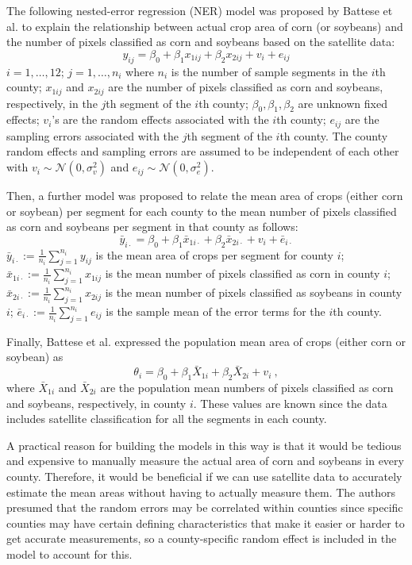 \documentclass{article}
\begin{document}
The following nested-error regression (NER) model was proposed by Battese et al. to explain the relationship between actual crop area of corn (or soybeans) and the number of pixels classified as corn and soybeans based on the satellite data:
\begin{equation}
y_{ij}=\beta_0+\beta_1x_{1ij}+\beta_2x_{2ij}+v_i+e_{ij}
\end{equation}
$i=1,\dots,12$; $j=1,\dots,n_i$ where $n_i$ is the number of sample segments in the $i$th county; $x_{1ij}$ and $x_{2ij}$ are the number of pixels classified as corn and soybeans, respectively, in the $j$th segment of the $i$th county; $\beta_0,\beta_1,\beta_2$ are unknown fixed effects; $v_i$'s are the random effects associated with the $i$th county; $e_{ij}$ are the sampling errors associated with the $j$th segment of the $i$th county. The county random effects and sampling errors are assumed to be independent of each other with $v_i \sim \mathcal N(0,\sigma_v^2)$ and $e_{ij} \sim \mathcal N(0,\sigma_e^2)$.
\medbreak

Then, a further model was proposed to relate the mean area of crops (either corn or soybean) per segment for each county to the mean number of pixels classified as corn and soybeans per segment in that county as follows:
\begin{equation}
\bar y_{i\cdot} = \beta_0+\beta_1\bar x_{1i\cdot}+\beta_2\bar x_{2i\cdot}+v_i+\bar e_{i\cdot}
\end{equation}
$\bar y_{i\cdot}:=\frac{1}{n_i}\sum_{j=1}^{n_i}y_{ij}$ is the mean area of crops per segment for county $i$;  $\bar x_{1i\cdot}:=\frac{1}{n_i}\sum_{j=1}^{n_i}x_{1ij}$ is the mean number of pixels classified as corn in county $i$; $\bar x_{2i\cdot}:=\frac{1}{n_i}\sum_{j=1}^{n_i}x_{2ij}$ is the mean number of pixels classified as soybeans in county $i$; $\bar e_{i\cdot}:=\frac{1}{n_i}\sum_{j=1}^{n_i}e_{ij}$ is the sample mean of the error terms for the $i$th county.
\medbreak

Finally, Battese et al. expressed the population mean area of crops (either corn or soybean) as
\begin{equation}
\theta_i = \beta_0+\beta_1\bar X_{1i}+\beta_2\bar X_{2i}+v_i\ ,
\end{equation}
where $\bar X_{1i}$ and $\bar X_{2i}$ are the population mean numbers of pixels classified as corn and soybeans, respectively, in county $i$. These values are known since the data includes satellite classification for all the segments in each county.
\medbreak

A practical reason for building the models in this way is that it would be tedious and expensive to manually measure the actual area of corn and soybeans in every county. Therefore, it would be beneficial if we can use satellite data to accurately estimate the mean areas without having to actually measure them. The authors presumed that the random errors may be correlated within counties since specific counties may have certain defining characteristics that make it easier or harder to get accurate measurements, so a county-specific random effect is included in the model to account for this.
\medbreak
\end{document}
